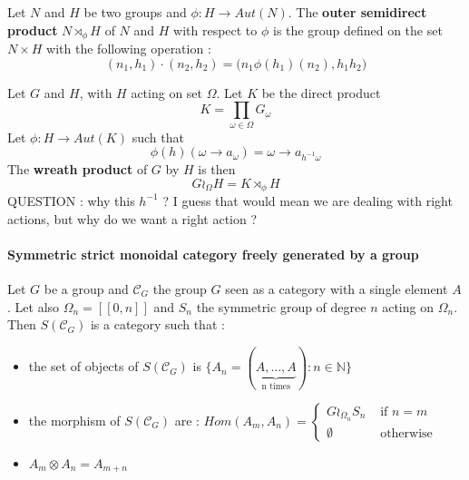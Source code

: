 \begin{defn}
    Let $N$ and $H$ be two groups and $\phi : H \rightarrow Aut(N)$.
    The  \textbf{outer semidirect product} $N\rtimes_\phi H$ of $N$ and $H$ with respect to $\phi$ is the group defined on the set $N\times H$ with the following operation :
    $$(n_1,h_1)\cdot (n_2,h_2) = \big(n_1\phi(h_1)(n_2),h_1h_2\big)$$
\end{defn}

\begin{defn}
    Let $G$ and $H$, with $H$ acting on set $\Omega$. Let $K$ be the direct product
    $$K = \prod_{\omega \in \Omega}G_\omega$$
    Let $\phi : H \rightarrow Aut(K)$ such that
    $$\phi(h)(\omega\rightarrow a_\omega) = \omega \rightarrow a_{h^{-1}\omega}$$
    The \textbf{wreath product} of $G$ by $H$ is then
    $$G\wr_\Omega H = K \rtimes_{\phi}H$$
    QUESTION : why this $h^{-1}$ ? I guess that would mean we are dealing with right actions, but why do we want a right action ?
\end{defn}

\paragraph{Symmetric strict monoidal category freely generated by a group}

\begin{prop}
    Let $G$ be a group and $\mathcal{C}_G$ the group $G$ seen as a category with a single element $A$. Let also $\Omega_n = [\![0,n]\!]$ and $S_n$ the symmetric group of degree $n$ acting on $\Omega_n$. Then $S(\mathcal{C}_G)$ is a category such that :
    \begin{itemize}
        \item the set of objects of $S(\mathcal{C}_G)$ is $\{A_n = (\underbrace{A,\dots,A}_\textrm{n times}) : n\in \mathbb{N}\}$
        \item the morphism of $S(\mathcal{C}_G)$ are : $Hom(A_m,A_n) = \begin{cases}
                      G\wr_{\Omega_n}S_n & \mbox{ if } n = m \\
                      \emptyset          & \mbox{ otherwise}
                  \end{cases}$
        \item $A_m\otimes A_n = A_{m+n}$
    \end{itemize}

\end{prop}

